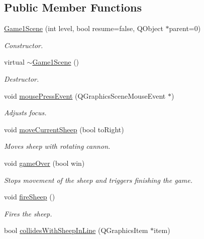 \subsection*{\-Public \-Member \-Functions}
\begin{DoxyCompactItemize}
\item 
\hyperlink{classGame1Scene_a500b6864f463c38f17bf319131979ba4}{\-Game1\-Scene} (int level, bool resume=false, \-Q\-Object $\ast$parent=0)
\begin{DoxyCompactList}\small\item\em \-Constructor. \end{DoxyCompactList}\item 
virtual \hyperlink{classGame1Scene_a810e661e0de4105509207c86bc35cbe2}{$\sim$\-Game1\-Scene} ()
\begin{DoxyCompactList}\small\item\em \-Destructor. \end{DoxyCompactList}\item 
void \hyperlink{classGame1Scene_a3f20ac9bd39e4506c1dca07428a7e1b2}{mouse\-Press\-Event} (\-Q\-Graphics\-Scene\-Mouse\-Event $\ast$)
\begin{DoxyCompactList}\small\item\em \-Adjusts focus. \end{DoxyCompactList}\item 
void \hyperlink{classGame1Scene_ad6356f0a62d21fefd26110d6ea4ab10a}{move\-Current\-Sheep} (bool to\-Right)
\begin{DoxyCompactList}\small\item\em \-Moves sheep with rotating cannon. \end{DoxyCompactList}\item 
void \hyperlink{classGame1Scene_abd59b6c83eb85402d1f07ad06728f05b}{game\-Over} (bool win)
\begin{DoxyCompactList}\small\item\em \-Stops movement of the sheep and triggers finishing the game. \end{DoxyCompactList}\item 
void \hyperlink{classGame1Scene_a82ce3eadf3a51778be131f8b92632991}{fire\-Sheep} ()
\begin{DoxyCompactList}\small\item\em \-Fires the sheep. \end{DoxyCompactList}\item 
bool \hyperlink{classGame1Scene_ac171b3011a3526480c9483b2a486a984}{collides\-With\-Sheep\-In\-Line} (\-Q\-Graphics\-Item $\ast$item)

\end{DoxyCompactItemize}
